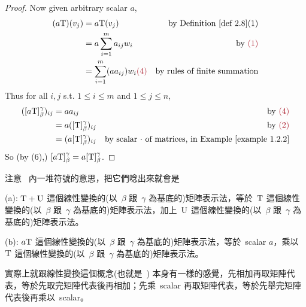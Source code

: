 \begin{proof}
Now given arbitrary scalar \(a\),
\begin{align*}
    (a\T)(v_j) & = a\T(v_j) & \text{by \DEF{2.8}(1)} \\
                   & = a\sum_{i = 1}^m a_{ij} w_i & \text{by \MAROON{(1)}} \\
                   & = \sum_{i = 1}^m (a a_{ij}) w_i \MAROON{(4)} & \text{by rules of finite summation}
\end{align*}
Thus for all \(i, j\) s.t. \(1 \le i \le m\) and \(1 \le j \le n\),
\begin{align*}
    ([a\T]_{\beta}^{\gamma})_{ij} & = a a_{ij} & \text{by \MAROON{(4)}} \\
                                  & = a([\T]_{\beta}^{\gamma})_{ij} & \text{by \MAROON{(2)}} \\
                                      & = (a[\T]_{\beta}^{\gamma})_{ij} & \text{by scalar \(\cdot\) of matrices, in \EXAMPLE{1.2.2}}
\end{align*}
So (by (6),) \([a\mathrm{T}]_{\beta}^{\gamma} = a[\mathrm{T}]_{\beta}^{\gamma}\).
\end{proof}

\begin{note}
注意\  內一堆符號的意思，把它們唸出來就會是

(a): \(\mathrm{T} + \mathrm{U}\) 這個線性變換的(以\ \(\beta\) 跟\ \(\gamma\) 為基底的)矩陣表示法，等於\ \(\mathrm{T}\) 這個線性變換的(以\ \(\beta\) 跟\ \(\gamma\) 為基底的)矩陣表示法，加上\ \(\mathrm{U}\) 這個線性變換的(以\ \(\beta\) 跟\ \(\gamma\) 為基底的)矩陣表示法。

(b): \(a\mathrm{T}\) 這個線性變換的(以\ \(\beta\) 跟\ \(\gamma\) 為基底的)矩陣表示法，等於\ scalar \(a\)，乘以\ \(\mathrm{T}\) 這個線性變換的(以\ \(\beta\) 跟\ \(\gamma\) 為基底的)矩陣表示法。

實際上就跟線性變換這個概念(也就是\ ) 本身有一樣的感覺，先相加再取矩陣代表，等於先取完矩陣代表後再相加；先乘\ scalar 再取矩陣代表，等於先舉完矩陣代表後再乘以\ scalar。
\end{note}


